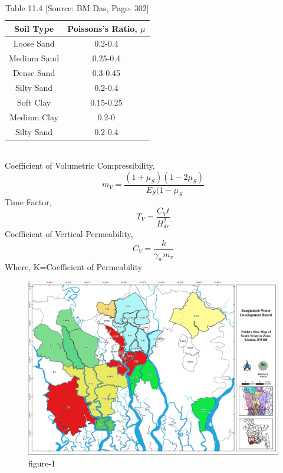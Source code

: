 \documentclass[12pt, a4paper]{article}
\begin{document}
\begin{table}[ht]
    \centering
    \begin{tabular}{|c|c|}
    \hline
    \textbf{Soil Type} & \textbf{Poissons's Ratio, $\mu$}\\
    \hline
    Loose Sand & 0.2-0.4\\
    \hline
    Medium Sand & 0.25-0.4\\
    \hline
    Dense Sand & 0.3-0.45\\
    \hline
    Silty Sand & 0.2-0.4\\
    \hline
    Soft Clay & 0.15-0.25\\
    \hline
    Medium Clay & 0.2-0\\
    \hline
    Silty Sand & 0.2-0.4\\
    \hline
    \end{tabular}
    \caption{Table 11.4 [Source: BM Das, Page- 302]}
    \label{tab:my_label}
\end{table}\\
Coefficient of Volumetric Compressibility, \[m_V=\frac{(1+\mu_S)(1-2\mu_S)}{E_S(1-\mu_S}\]
Time Factor, \[T_V=\frac{C_Vt}{H^2_{dr}}\]
Coefficient of Vertical Permeability, \[C_V=\frac{k}{\gamma_wm_v}\]
Where, K=Coefficient of Permeability\\

\begin{figure}
    \centering
    \includegraphics[width=\linewidth]{noname.png}
    \caption{figure-1}
    \label{fig:my_label}     
\end{figure}
\end{document}
